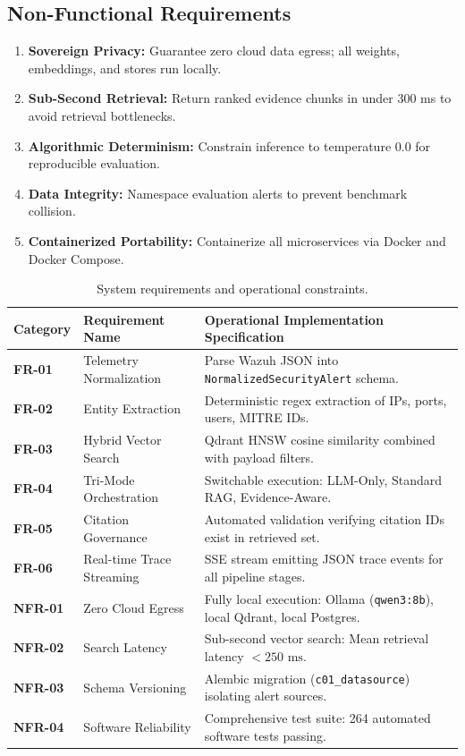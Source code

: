 \subsection{Non-Functional Requirements}
\begin{enumerate}[itemsep=1pt,topsep=2pt]
  \item \textbf{Sovereign Privacy:} Guarantee zero cloud data egress; all weights, embeddings, and stores run locally.
  \item \textbf{Sub-Second Retrieval:} Return ranked evidence chunks in under 300 ms to avoid retrieval bottlenecks.
  \item \textbf{Algorithmic Determinism:} Constrain inference to temperature 0.0 for reproducible evaluation.
  \item \textbf{Data Integrity:} Namespace evaluation alerts to prevent benchmark collision.
  \item \textbf{Containerized Portability:} Containerize all microservices via Docker and Docker Compose.
\end{enumerate}

\begin{table}[!htbp]
\centering
\caption{System requirements and operational constraints.}
\label{tab:system_requirements}
\small
\begin{tabularx}{\textwidth}{@{}l p{4.0cm} X@{}}
\toprule
\textbf{Category} & \textbf{Requirement Name} & \textbf{Operational Implementation Specification} \\
\midrule
\textbf{FR-01} & Telemetry Normalization & Parse Wazuh JSON into \texttt{NormalizedSecurityAlert} schema. \\
\textbf{FR-02} & Entity Extraction & Deterministic regex extraction of IPs, ports, users, MITRE IDs. \\
\textbf{FR-03} & Hybrid Vector Search & Qdrant HNSW cosine similarity combined with payload filters. \\
\textbf{FR-04} & Tri-Mode Orchestration & Switchable execution: LLM-Only, Standard RAG, Evidence-Aware. \\
\textbf{FR-05} & Citation Governance & Automated validation verifying citation IDs exist in retrieved set. \\
\textbf{FR-06} & Real-time Trace Streaming & SSE stream emitting JSON trace events for all pipeline stages. \\
\midrule
\textbf{NFR-01} & Zero Cloud Egress & Fully local execution: Ollama (\texttt{qwen3:8b}), local Qdrant, local Postgres. \\
\textbf{NFR-02} & Search Latency & Sub-second vector search: Mean retrieval latency $< 250\text{ ms}$. \\
\textbf{NFR-03} & Schema Versioning & Alembic migration (\texttt{c01\_datasource}) isolating alert sources. \\
\textbf{NFR-04} & Software Reliability & Comprehensive test suite: 264 automated software tests passing. \\
\bottomrule
\end{tabularx}
\end{table}

